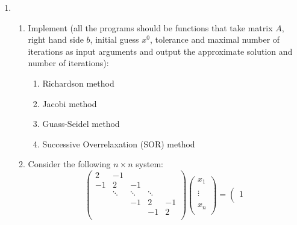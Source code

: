 \documentclass[12pt]{amsart}
\numberwithin{equation}{section}
\numberwithin{table}{section}
\numberwithin{figure}{section}
\numberwithin{algorithm}{section}
\begin{document}
\begin{enumerate}
\begin{align*}
\begin{array}{ccccc}
	  b &  \\
	\end{array}
	\right)
=\left(
    \begin{array}{ccccc}
	    & \frac{b}{a} \\
	  \frac{b}{c} &  \\
	\end{array}
	\right)
\end{align*}\
Now we try to calculate the eigenvalues of $D^{-1}R$ where $|\lambda I_2-D^{-1}R|=0$\
Thus $\lambda ^2= \frac{b^2}{ac}<1$, which means the absolute value of every eigenvalue is less than $1$.
Hence, $\rho(D^{-1}R)<1 $, which means Jacobi method converges.
\\

\item \begin{enumerate}
	\item Implement (all the programs should be functions that take matrix $A$, right hand side $b$, initial guess $x^0$, tolerance and maximal number of iterations as input arguments and output the approximate solution and number of iterations):
		\begin{enumerate}
		\item Richardson method
		\item Jacobi method
		\item Guass-Seidel method
		\item Successive Overrelaxation (SOR) method
		\end{enumerate}
 	\item Consider the following $n \times n$ system:
		$$\left(%
	\begin{array}{ccccc}
	  2 & -1 &  &  &  \\
	  -1 & 2 & -1 &  &  \\
	   & \ddots & \ddots & \ddots &  \\
	   &  & -1 & 2 & -1 \\
	   &  &  & -1 & 2 \\
	\end{array}%
	\right)
	\left(%
	\begin{array}{c}	
	  x_1 \\
	   \\
	   \vdots\\
	   \\
	  x_n \\
	\end{array}%
	\right)=
	\left(%
	\begin{array}{r}
	  1 \\

\end{array}$$
\end{enumerate}
\end{enumerate}
\end{document}
